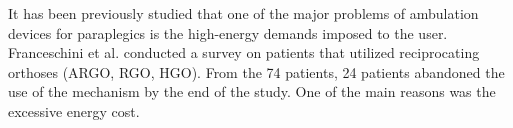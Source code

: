    It has been previously studied that one of the major problems of ambulation devices for paraplegics is the high-energy demands imposed to the user. Franceschini et al. \cite{FRANCESCHINI1997582} conducted a survey on patients that utilized reciprocating orthoses (ARGO, RGO, HGO). From the 74 patients, 24 patients abandoned the use of the mechanism by the end of the study. One of the main reasons was the excessive energy cost.
